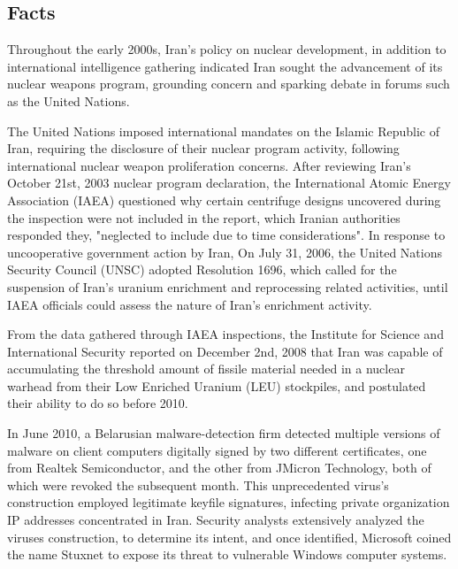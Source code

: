 \documentclass[12pt]{article}
\begin{document}
\begin{multicols}{2}

\section{Facts}

Throughout the early 2000s, Iran's policy on nuclear development, in addition to international intelligence gathering indicated Iran sought the advancement of its nuclear weapons program, grounding concern and sparking debate in forums such as the United Nations.\cite{unitedNationsResolutions}

The United Nations imposed international mandates on the Islamic Republic of Iran, requiring the disclosure of their nuclear program activity, following international nuclear weapon proliferation concerns. After reviewing Iran's October 21st, 2003 nuclear program declaration, the International Atomic Energy Association (IAEA) questioned why certain centrifuge designs uncovered during the inspection were not included in the report, which Iranian authorities responded they, "neglected to include due to time considerations".\cite{implementationOfNPTSafeguards} In response to uncooperative government action by Iran, On July 31, 2006, the United Nations Security Council (UNSC) adopted Resolution 1696, which called for the suspension of Iran's uranium enrichment and reprocessing related activities, until IAEA officials could assess the nature of Iran's enrichment activity.\cite{resolution1696}

From the data gathered through IAEA inspections, the Institute for Science and International Security reported on December 2nd, 2008 that Iran was capable of accumulating the threshold amount of fissile material needed in a nuclear warhead from their Low Enriched Uranium (LEU) stockpiles, and postulated their ability to do so before 2010.\cite{hasIranAchievedaNuclearWeapon}

In June 2010, a Belarusian malware-detection firm detected multiple versions of malware on client computers digitally signed by two different certificates, one from Realtek Semiconductor, and the other from JMicron Technology, both of which were revoked the subsequent month.\cite{theRealStoryOfStuxnet} This unprecedented virus's construction employed legitimate keyfile signatures, infecting private organization IP addresses concentrated in Iran.\cite{w32.stuxnetDossier} Security analysts extensively analyzed the viruses construction, to determine its intent, and once identified, Microsoft coined the name Stuxnet to expose its threat to vulnerable Windows computer systems.\cite{microsoftCoinsStuxnet}


\end{multicols}
\end{document}
